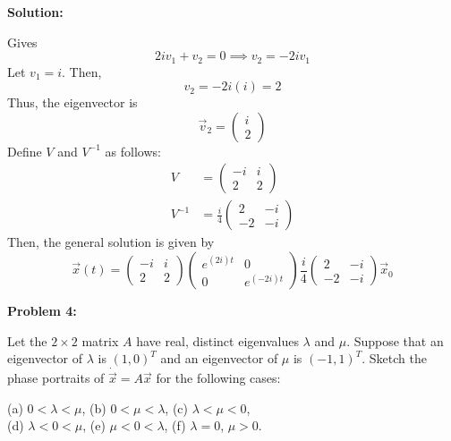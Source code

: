 \documentclass[12pt]{article}
\newenvironment{problem}[1]{
    \textbf{Problem #1:}
}{
    \rmfamily \vspace{1em}
}
\newenvironment{solution}{
    \textbf{Solution:}
    
}{
    
    \vspace{2em}
}
\begin{document}
\begin{solution}
\[    \]
    Gives
    \[
        2iv_1 + v_2 = 0 \implies v_2 = -2iv_1
    \]
    Let \(v_1 = i\). Then,
    \[
        v_2 = -2i(i) = 2
    \]
    Thus, the eigenvector is
    \[
        \vec{v}_2 = \begin{pmatrix} i \\ 2 \end{pmatrix}
    \]
    Define \(V\) and \(V^{-1}\) as follows:
    \[
        \begin{aligned}
            V &= \begin{pmatrix} -i & i \\ 2 & 2 \end{pmatrix} \\
            V^{-1} &= \frac{i}{4}\begin{pmatrix} 2 & -i \\ -2 & -i \end{pmatrix}
        \end{aligned}
    \]
    Then, the general solution is given by
    \[
        \vec{x}(t) = \begin{pmatrix} -i & i \\ 2 & 2 \end{pmatrix} \begin{pmatrix} e^{\left(2i\right)t} & 0 \\ 0 & e^{\left(-2i\right)t} \end{pmatrix} \frac{i}{4}\begin{pmatrix} 2 & -i \\ -2 & -i \end{pmatrix} \vec{x}_0
    \]
\end{solution}

\newpage

\begin{problem}{4}
    Let the \(2 \times 2\) matrix \(A\) have real, distinct eigenvalues \(\lambda\) and \(\mu\). Suppose
that an eigenvector of \(\lambda\) is \((1, 0)^T\) and an eigenvector of \(\mu\) is \((-1, 1)^T\).
Sketch the phase portraits of \(\dot{\vec{x}} = A\vec{x}\) for the following cases:

(a) \(0 < \lambda < \mu\), (b) \(0 < \mu < \lambda\), (c) \(\lambda < \mu < 0\),\\
(d) \(\lambda < 0 < \mu\), (e) \(\mu < 0 < \lambda\), (f) \(\lambda = 0\), \(\mu > 0\).

\end{problem}
\end{document}

